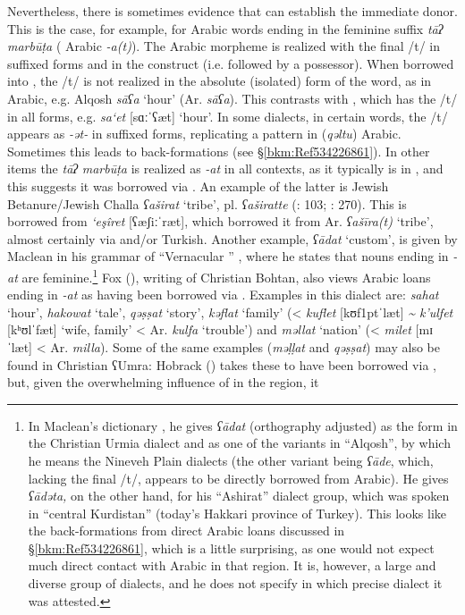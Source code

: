 \documentclass[output=paper]{langsci/langscibook}
\begin{document}
Nevertheless, there is sometimes evidence that can establish the immediate donor. This is the case, for example, for Arabic words ending in the feminine suffix \textit{tāʔ} \textit{marbūṭa} ( Arabic \textit{{}-a(t)}). The Arabic morpheme is realized with the final /t/ in suffixed forms and in the construct (i.e. followed by a possessor). When borrowed into , the /t/ is not realized in the absolute (isolated) form of the word, as in Arabic, e.g. Alqosh \textit{sāʕa} ‘hour’ (Ar. \textit{sāʕa}). This contrasts with , which has the /t/ in all forms, e.g.  \textit{sa‘et} [sɑːˈʕæt] ‘hour’. In some  dialects, in certain words, the /t/ appears as \textit{{}-ət-} in suffixed forms, replicating a pattern in (\textit{qəltu}) Arabic. Sometimes this leads to {back-formations} (see §\ref{bkm:Ref534226861}). In other items the \textit{tāʔ} \textit{marbūṭa} is realized as \textit{{}-at} in all contexts, as it typically is in , and this suggests it was borrowed via . An example of the latter is Jewish Betanure/Jewish Challa \textit{ʕaširat} ‘tribe’, pl. \textit{ʕaširatte} (\citealt{Mutzafi2008}: 103; \citealt{Fassberg2010}: 270). This is borrowed from  \textit{‘eşîret} [ʕæʃiːˈræt], which borrowed it from Ar. \textit{ʕašīra(t)} ‘tribe’, almost certainly via  and/or  Turkish. Another example, \textit{ʕādat} ‘custom’, is given by Maclean in his grammar of ``Vernacular '' \citep[35]{Maclean1895}, where he states that nouns ending in \textit{\nobreakdash-at} are feminine.\footnote{\textrm{In Maclean’s dictionary} \textrm{\citep[235]{Maclean1901}, he gives} \textrm{\textit{ʕādat} }\textrm{({orthography} adjusted)}\textrm{ }\textrm{as the form in the Christian Urmia dialect and as one of the variants in ``Alqosh'', by which he means the Nineveh Plain dialects (the other variant being} \textrm{\textit{ʕāde}}\textrm{, which, lacking the final /t/, appears to be directly borrowed from Arabic). He gives} \textrm{\textit{ʕādəta,}} \textrm{on the other hand, for his ``Ashirat'' dialect group, which was spoken in ``central Kurdistan'' (today’s Hakkari province of Turkey). This looks like the {back-formations} from direct Arabic loans discussed in §\ref{bkm:Ref534226861}, which is a little surprising, as one would not expect much direct contact with Arabic in that region. It is, however, a large and diverse group of dialects, and he does not specify in which precise dialect it was attested.}} Fox (\citeyear[91]{Fox2009}), writing of Christian Bohtan, also views Arabic loans ending in \textit{{}-at} as having been borrowed via . Examples in this dialect are: \textit{sahat} ‘hour’, \textit{hakowat} ‘tale’, \textit{qəṣṣat} ‘story’, \textit{kəflat} ‘family’ (<  \textit{kuflet} [kʊf\kern 1ptˈlæt] \textit{{\textasciitilde} k’ulfet} [kʰʊlˈfæt] ‘wife, family’ < Ar. \textit{kulfa} ‘trouble’) and \textit{məllat} ‘nation’ (<  \textit{milet} [mɪˈlæt] < Ar. \textit{milla}). Some of the same examples (\textit{məḷḷat} and \textit{qəṣṣat}) may also be found in Christian ʕUmra: Hobrack (\citeyear[108]{Hobrack2000}) takes these to have been borrowed via , but, given the overwhelming influence of  in the region, it 
\end{document}

